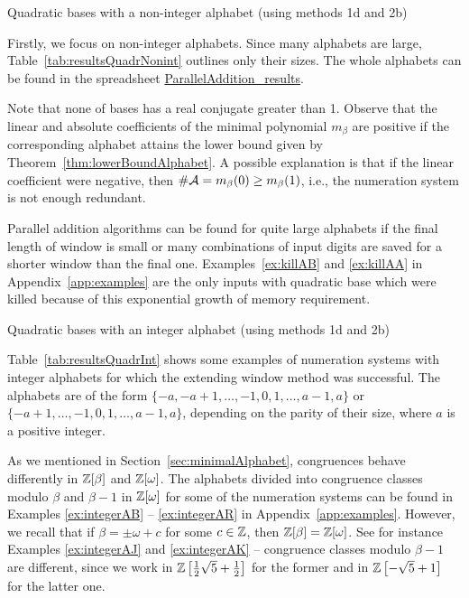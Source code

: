 \begin{table}[htpb]
	\begin{center}
	
	\end{center}
\caption{Quadratic bases with a non-integer alphabet (using methods 1d and 2b)}
\label{tab:resultsQuadrNonint}
\end{table}

Firstly, we focus on non-integer alphabets. Since many alphabets are large, Table~\ref{tab:resultsQuadrNonint} outlines only their sizes. The whole alphabets can be found in the spreadsheet \href{https://docs.google.com/spreadsheets/d/1TnhrHdefHfHa0WSeVs4q6XVj3epjPlPlnoekE0E1xeM/edit?usp=sharing}{ParallelAddition\_results}.

Note that none of bases has a real conjugate greater than 1. Observe that the linear and absolute coefficients of the minimal polynomial $m_\beta$ are positive if the corresponding alphabet attains the lower bound given by Theorem~\ref{thm:lowerBoundAlphabet}. A possible explanation is that if the linear coefficient were negative, then $\#\mathcal{A}=m_\beta(0)\geq m_\beta(1)$, i.e., the numeration system is not enough redundant.

Parallel addition algorithms can be found for quite large alphabets  if the final length of window is small or many combinations of input digits  are saved for a shorter window than the final one. Examples~\ref{ex:killAB} and \ref{ex:killAA} in Appendix~\ref{app:examples} are the only inputs with quadratic base which were killed because of this exponential growth of memory requirement.

 
\begin{table}[htpb]
	\begin{center}
	
	\end{center}
\caption{Quadratic bases with an integer alphabet (using methods 1d and 2b)}
\label{tab:resultsQuadrInt}
\end{table}

Table~\ref{tab:resultsQuadrInt} shows some examples of numeration systems with integer alphabets for which the extending window method was successful. The alphabets are of the form $\{-a, -a+1, \dots, -1,0,1,\dots, a-1,a\}$ or $\{-a+1, \dots, -1,0,1,\dots, a-1,a\}$, depending on the parity of their size, where $a$ is a positive integer.

As we mentioned in Section~\ref{sec:minimalAlphabet}, congruences behave differently in $\mathbb{Z}[\beta]$ and $\mathbb{Z}[\omega]$. The alphabets divided into congruence classes modulo $\beta$ and $\beta-1$ in $\mathbb{Z}[\omega]$ for some of the numeration systems can be found in Examples \ref{ex:integerAB} -- \ref{ex:integerAR} in Appendix~\ref{app:examples}. However, we recall that if $\beta=\pm \omega+c$  for some $c\in\mathbb{Z}$, then $\mathbb{Z}[\beta]=\mathbb{Z}[\omega]$. See for instance Examples \ref{ex:integerAJ} and \ref{ex:integerAK} -- congruence classes modulo $\beta-1$ are different, since we work in $\mathbb{Z}\left[\frac{1}{2} \sqrt{5} + \frac{1}{2}\right]$ for the former and in $\mathbb{Z}\left[-\sqrt{5} + 1\right]$ for the latter one.

